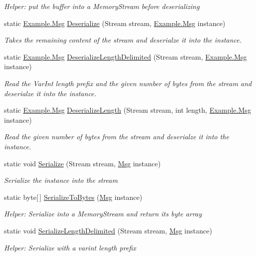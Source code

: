 \begin{DoxyCompactItemize}
\begin{DoxyCompactList}\small\item\em Helper\+: put the buffer into a Memory\+Stream before deserializing\end{DoxyCompactList}\item 
static \hyperlink{class_example_1_1_msg}{Example.\+Msg} \hyperlink{class_example_1_1_msg_aae32b461bf8880ecc0a02f36079bcd8e}{Deserialize} (Stream stream, \hyperlink{class_example_1_1_msg}{Example.\+Msg} instance)
\begin{DoxyCompactList}\small\item\em Takes the remaining content of the stream and deserialze it into the instance.\end{DoxyCompactList}\item 
static \hyperlink{class_example_1_1_msg}{Example.\+Msg} \hyperlink{class_example_1_1_msg_abb02674ad6bc79321e7731ed966a4799}{Deserialize\+Length\+Delimited} (Stream stream, \hyperlink{class_example_1_1_msg}{Example.\+Msg} instance)
\begin{DoxyCompactList}\small\item\em Read the Var\+Int length prefix and the given number of bytes from the stream and deserialze it into the instance.\end{DoxyCompactList}\item 
static \hyperlink{class_example_1_1_msg}{Example.\+Msg} \hyperlink{class_example_1_1_msg_a50902d520a9e236c8d4d3bdd1a901a28}{Deserialize\+Length} (Stream stream, int length, \hyperlink{class_example_1_1_msg}{Example.\+Msg} instance)
\begin{DoxyCompactList}\small\item\em Read the given number of bytes from the stream and deserialze it into the instance.\end{DoxyCompactList}\item 
static void \hyperlink{class_example_1_1_msg_a49aaee7375865354ce12aedca5a19f8e}{Serialize} (Stream stream, \hyperlink{class_example_1_1_msg}{Msg} instance)
\begin{DoxyCompactList}\small\item\em Serialize the instance into the stream\end{DoxyCompactList}\item 
static byte\mbox{[}$\,$\mbox{]} \hyperlink{class_example_1_1_msg_ad5eca0b03532f735363b71b099db9d2c}{Serialize\+To\+Bytes} (\hyperlink{class_example_1_1_msg}{Msg} instance)
\begin{DoxyCompactList}\small\item\em Helper\+: Serialize into a Memory\+Stream and return its byte array\end{DoxyCompactList}\item 
static void \hyperlink{class_example_1_1_msg_a68a58ceca8838160393c72a1013e78c0}{Serialize\+Length\+Delimited} (Stream stream, \hyperlink{class_example_1_1_msg}{Msg} instance)
\begin{DoxyCompactList}\small\item\em Helper\+: Serialize with a varint length prefix\end{DoxyCompactList}\end{DoxyCompactItemize}
